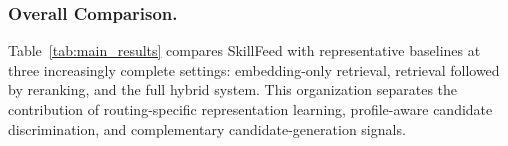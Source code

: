 \documentclass[letterpaper]{article} %
\begin{document}
\subsubsection{Overall Comparison.}

Table~\ref{tab:main_results} compares SkillFeed with representative baselines at three increasingly complete settings: embedding-only retrieval, retrieval followed by reranking, and the full hybrid system. This organization separates the contribution of routing-specific representation learning, profile-aware candidate discrimination, and complementary candidate-generation signals.
\end{document}
